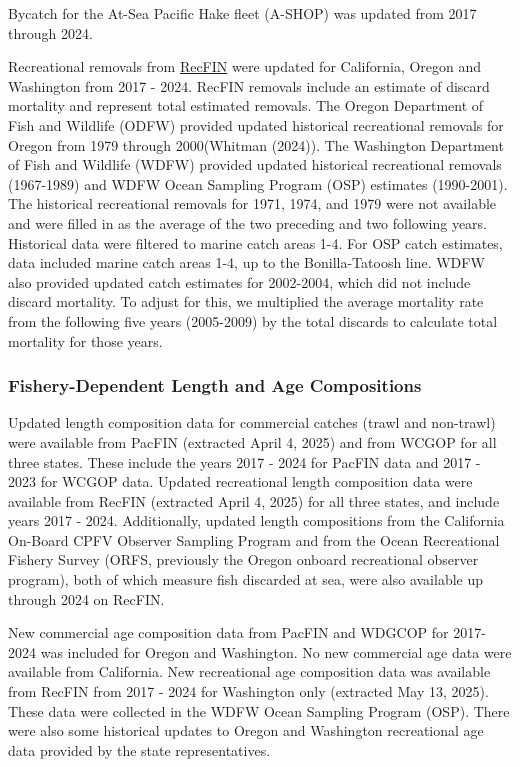 \documentclass[
]{scrartcl}
\begin{document}
Bycatch for the At-Sea Pacific Hake fleet (A-SHOP) was updated from 2017
through 2024.

Recreational removals from \href{www.recfin.org}{RecFIN} were updated
for California, Oregon and Washington from 2017 - 2024. RecFIN removals
include an estimate of discard mortality and represent total estimated
removals. The Oregon Department of Fish and Wildlife (ODFW) provided
updated historical recreational removals for Oregon from 1979 through
2000(Whitman (2024)). The Washington Department of Fish and Wildlife
(WDFW) provided updated historical recreational removals (1967-1989) and
WDFW Ocean Sampling Program (OSP) estimates (1990-2001). The historical
recreational removals for 1971, 1974, and 1979 were not available and
were filled in as the average of the two preceding and two following
years. Historical data were filtered to marine catch areas 1-4. For OSP
catch estimates, data included marine catch areas 1-4, up to the
Bonilla-Tatoosh line. WDFW also provided updated catch estimates for
2002-2004, which did not include discard mortality. To adjust for this,
we multiplied the average mortality rate from the following five years
(2005-2009) by the total discards to calculate total mortality for those
years.

\subsubsection{Fishery-Dependent Length and Age
Compositions}\label{sec-fd_comps}

Updated length composition data for commercial catches (trawl and
non-trawl) were available from PacFIN (extracted April 4, 2025) and from
WCGOP for all three states. These include the years 2017 - 2024 for
PacFIN data and 2017 - 2023 for WCGOP data. Updated recreational length
composition data were available from RecFIN (extracted April 4, 2025)
for all three states, and include years 2017 - 2024. Additionally,
updated length compositions from the California On-Board CPFV Observer
Sampling Program and from the Ocean Recreational Fishery Survey (ORFS,
previously the Oregon onboard recreational observer program), both of
which measure fish discarded at sea, were also available up through 2024
on RecFIN.

New commercial age composition data from PacFIN and WDGCOP for 2017-2024
was included for Oregon and Washington. No new commercial age data were
available from California. New recreational age composition data was
available from RecFIN from 2017 - 2024 for Washington only (extracted
May 13, 2025). These data were collected in the WDFW Ocean Sampling
Program (OSP). There were also some historical updates to Oregon and
Washington recreational age data provided by the state representatives.
\end{document}
